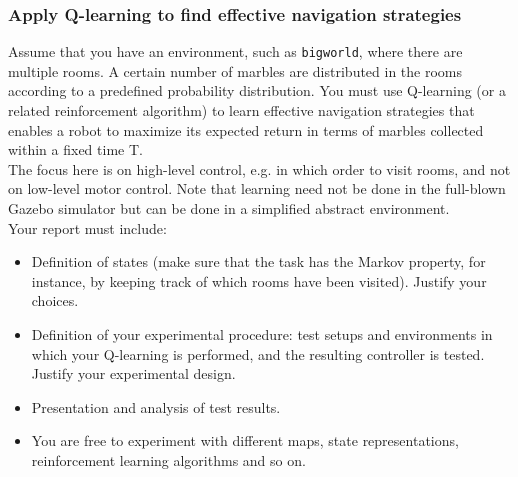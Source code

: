 \documentclass[../../Main.tex]{subfiles}
\begin{document}
\subsubsection*{Apply Q-learning to find effective navigation strategies}%
\label{ssub:apply_q_learning_to_find_effective_navigation_strategies}
Assume that you have an environment, such as \texttt{bigworld}, where there are multiple rooms. A certain number of marbles are distributed in the rooms according to a predefined probability distribution. You must use Q-learning (or a related reinforcement algorithm) to learn effective navigation strategies that enables a robot to maximize its expected return in terms of marbles collected within a fixed time T.\\

The focus here is on high-level control, e.g. in which order to visit rooms, and not on low-level motor control. Note that learning need not be done in the full-blown Gazebo simulator but can be done in a simplified abstract environment.\\

Your report must include:

\begin{itemize}
	\item Definition of states (make sure that the task has the Markov property, for instance, by keeping track of which rooms have been visited). Justify your choices.
	\item Definition of your experimental procedure: test setups and environments in which your Q-learning is performed, and the resulting controller is tested. Justify your experimental design.
	\item Presentation and analysis of test results.
	\item You are free to experiment with different maps, state representations, reinforcement learning algorithms and so on.
\end{itemize}
\end{document}
